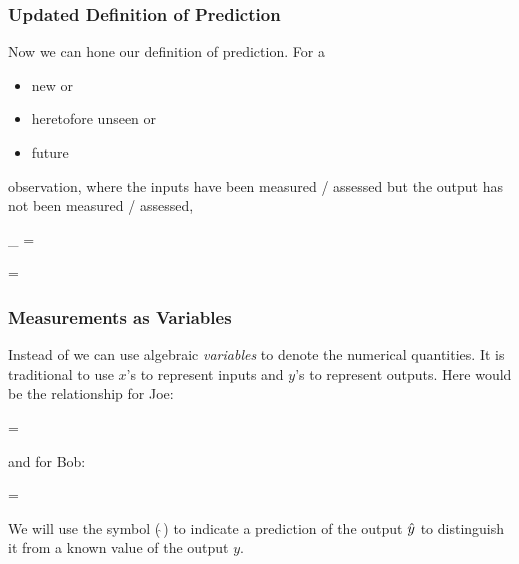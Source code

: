 \documentclass[handout]{beamer}
\begin{document}
\begin{frame}\frametitle{Updated Definition of Prediction}

\small 
Now we can hone our definition of prediction. For a 

\begin{itemize}
\item new or
\item heretofore unseen or
\item future
\end{itemize}

observation, where the inputs have been measured / assessed but the output has not been measured / assessed,

\beqn
{}_{} = 
\eeqn

\tiny 
\beqn
{} = 
\eeqn
\normalsize


\end{frame}


\begin{frame}\frametitle{Measurements as Variables}

Instead of  we can use algebraic \textit{variables} to denote the numerical quantities. It is traditional to use $x$'s to represent inputs and $y$'s to represent outputs. Here would be the relationship for Joe:


\beqn
{} = 
\eeqn

and for Bob:


\beqn
{} = 
\eeqn

We will use the  symbol ($\hat{~}$) to indicate a prediction of the output $\hat{y}$ to distinguish it from a known value of the output $y$.

\end{frame}
\end{document}
